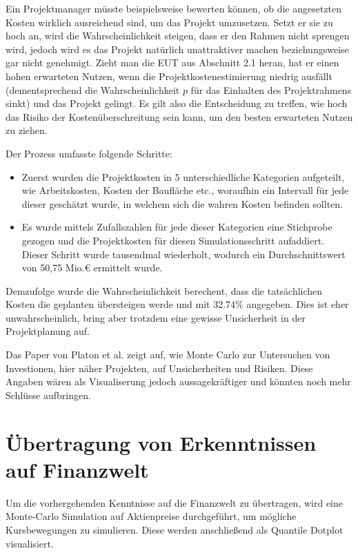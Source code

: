 Ein Projektmanager müsste beispielsweise bewerten können, ob die angesetzten Kosten wirklich ausreichend sind, um das Projekt umzusetzen. Setzt er sie zu hoch an, wird die Wahrscheinlichkeit steigen, dass er den Rahmen nicht sprengen wird, jedoch wird es das Projekt natürlich unattraktiver machen beziehungsweise gar nicht genehmigt. Zieht man die EUT aus Abschnitt 2.1 heran, hat er einen hohen erwarteten Nutzen, wenn die Projektkostenestimierung niedrig ausfällt (dementsprechend die Wahrscheinlichkeit \( p \) für das Einhalten des Projektrahmens sinkt) und das Projekt gelingt. Es gilt also die Entscheidung zu treffen, wie hoch das Risiko der Kostenüberschreitung sein kann, um den besten erwarteten Nutzen zu ziehen.

Der Prozess umfasste folgende Schritte:

\begin{itemize}
    \item Zuerst wurden die Projektkosten in 5 unterschiedliche Kategorien aufgeteilt, wie Arbeitskosten, Kosten der Baufläche etc., woraufhin ein Intervall für jede dieser geschätzt wurde, in welchem sich die wahren Kosten befinden sollten.
    \item Es wurde mittels Zufallszahlen für jede dieser Kategorien eine Stichprobe gezogen und die Projektkosten für diesen Simulationsschritt aufaddiert. Dieser Schritt wurde tausendmal wiederholt, wodurch ein Durchschnittswert von 50,75 Mio.€ ermittelt wurde.
\end{itemize}

Demzufolge wurde die Wahrscheinlichkeit berechent, dass die tatsächlichen Kosten die geplanten übersteigen werde und mit 32.74\% angegeben. Dies ist eher unwahrscheinlich, bring aber trotzdem eine gewisse Unsicherheit in der Projektplanung auf.

Das Paper von Platon et al. zeigt auf, wie Monte Carlo zur Untersuchen von Investionen, hier näher Projekten, auf Unsicherheiten und Risiken. Diese Angaben wären als Visualiserung jedoch aussagekräftiger und könnten noch mehr Schlüsse aufbringen.

\section{Übertragung von Erkenntnissen auf Finanzwelt}
Um die vorhergehenden Kenntnisse auf die Finanzwelt zu übertragen, wird eine Monte-Carlo Simulation auf Aktienpreise durchgeführt, um mögliche Kursbewegungen zu simulieren. Diese werden anschließend als Quantile Dotplot visualisiert.

